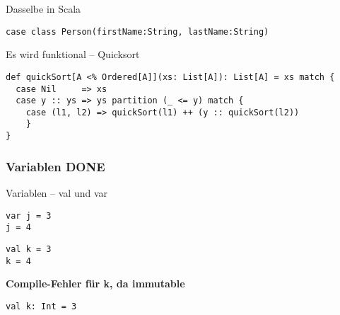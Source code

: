 \documentclass[14pt,aspectratio=169,trans]{beamer} %
\begin{document}
\begin{frame}[fragile]{}
 \begin{block}{Dasselbe in Scala}
\small
	\onslide<2->
  \begin{lstlisting}
case class Person(firstName:String, lastName:String)
	\end{lstlisting}
\end{block}
\end{frame}



\begin{frame}[fragile]{}
 \begin{block}{Es wird funktional -- Quicksort}
\scriptsize
	\onslide<2->
  \begin{lstlisting}
def quickSort[A <% Ordered[A]](xs: List[A]): List[A] = xs match {
  case Nil     => xs
  case y :: ys => ys partition (_ <= y) match {
    case (l1, l2) => quickSort(l1) ++ (y :: quickSort(l2)) 
	}
}
	\end{lstlisting}
\end{block}
\end{frame}

\begin{frame}[plain]
   \begin{centering} 
     \par 
   \end{centering} 
\end{frame} 

\subsubsection*{Variablen DONE}

\begin{frame}[fragile]
 \begin{block}{Variablen -- val und var}
\scriptsize
	\onslide<2->
  \begin{lstlisting}
var j = 3
j = 4
\end{lstlisting}
\begin{lstlisting}[firstnumber=3]
val k = 3
k = 4
\end{lstlisting}
\end{block}
\textbf{Compile-Fehler für k, da immutable}
\begin{lstlisting}[firstnumber=5]
val k: Int = 3
	\end{lstlisting}
\end{frame}
\end{document}
